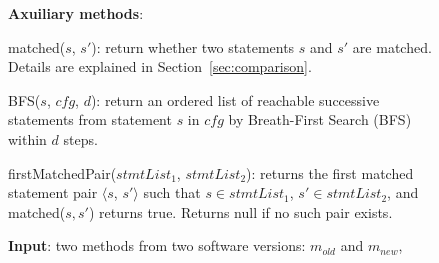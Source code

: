 \begin{figure}[t]
\textbf{Axuiliary methods}:

matched($\mathit{s}$, $\mathit{s'}$): return whether two statements
$\mathit{s}$ and $\mathit{s'}$ are matched. Details are explained
in Section~\ref{sec:comparison}.

BFS($\mathit{s}$, $\mathit{cfg}$, $\mathit{d}$): return an ordered list of reachable successive statements from statement $\mathit{s}$ in $\mathit{cfg}$ by Breath-First Search (BFS) within $\mathit{d}$ steps.

firstMatchedPair($\mathit{stmtList_1}$, $\mathit{stmtList_2}$): returns the first matched statement pair $\langle$$\mathit{s}$, $\mathit{s'}$$\rangle$ such that $\mathit{s} \in \mathit{stmtList_1}$, $\mathit{s'} \in \mathit{stmtList_2}$, and matched($\mathit{s}, \mathit{s'}$) returns true. Returns null if no such pair exists.




\textbf{Input}: two methods from two software versions: $\mathit{m_{old}}$ and $m_{new}$,


\end{figure}
